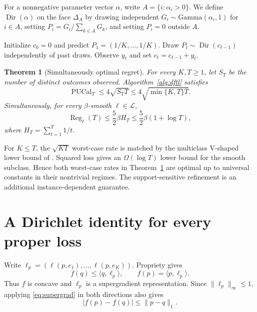 \documentclass{article}
\newtheorem{theorem}{Theorem}
\theoremstyle{definition}
\theoremstyle{remark}
\newcommand{\Dir}{\operatorname{Dir}}
\newcommand{\Reg}{\operatorname{Reg}}
\newcommand{\PUCal}{\operatorname{PUCal}}
\begin{document}
For a nonnegative parameter vector $\alpha$, write $A=\{i:\alpha_i>0\}$. We define $\Dir(\alpha)$ on the face $\Delta_A$ by drawing independent $G_i\sim\mathrm{Gamma}(\alpha_i,1)$ for $i\in A$, setting $P_i=G_i/\sum_{k\in A}G_k$, and setting $P_i=0$ outside $A$.

\begin{algorithm}[t]
\caption{Dirichlet Follow-the-Leader}
\label{alg:dftl}
\begin{algorithmic}[1]
\STATE Initialize $c_0=0$ and predict $P_1=(1/K,\ldots,1/K)$.
    \STATE Draw $P_t\sim\Dir(c_{t-1})$ independently of past draws.
  \ENDIF
  \STATE Observe $y_t$ and set $c_t=c_{t-1}+y_t$.
\ENDFOR
\end{algorithmic}
\end{algorithm}

\begin{theorem}[Simultaneously optimal regret]\label{thm:main}
For every $K,T\geq1$, let $S_T$ be the number of distinct outcomes observed. Algorithm~\ref{alg:dftl} satisfies \[ \PUCal_T\leq4\sqrt{S_TT}\leq4\sqrt{\min\{K,T\}T}. \] Simultaneously, for every $\beta$-smooth $\ell\in\mathcal L$, \[ \Reg_\ell(T)\leq\frac52\beta H_T \leq\frac52\beta(1+\log T), \] where $H_T=\sum_{t=1}^T1/t$.
\end{theorem}

For $K\leq T$, the $\sqrt{KT}$ worst-case rate is matched by the multiclass V-shaped lower bound of \citet{luo2024optimal}.  Squared loss gives an $\Omega(\log T)$ lower bound for the smooth subclass.  Hence both worst-case rates in Theorem~\ref{thm:main} are optimal up to universal constants in their nontrivial regimes.  The support-sensitive refinement is an additional instance-dependent guarantee.

\section{A Dirichlet identity for every proper loss}\label{sec:identity}

Write $\ell_p=(\ell(p,e_1),\ldots,\ell(p,e_K))$.  Propriety gives
\begin{equation}
 f(q)\leq\langle q,\ell_p\rangle,
 \qquad f(p)=\langle p,\ell_p\rangle.          \tag{3}\label{eq:supergrad}
\end{equation}
Thus $f$ is concave and $\ell_p$ is a supergradient representation.  Since $\|\ell_p\|_\infty\leq1$, applying \eqref{eq:supergrad} in both directions also gives
\begin{equation}
 |f(p)-f(q)|\leq\|p-q\|_1.                    \tag{4}\label{eq:lipschitz-f}
\end{equation}
\end{document}
